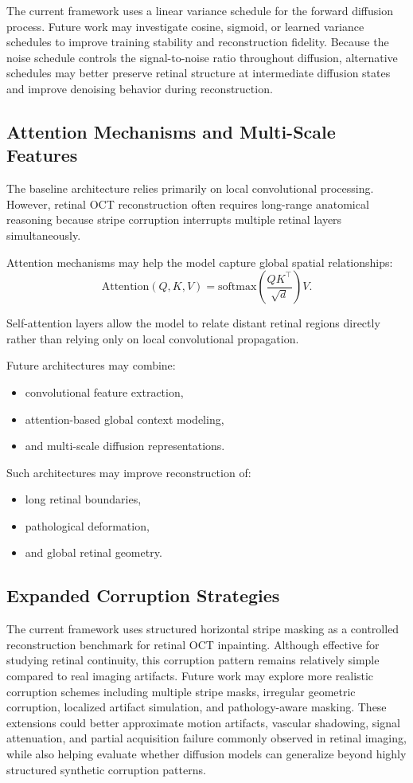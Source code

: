 \documentclass[12pt,oneside]{article}
\begin{document}
The current framework uses a linear variance schedule for the forward diffusion process. Future work may investigate cosine, sigmoid, or learned variance schedules to improve training stability and reconstruction fidelity. Because the noise schedule controls the signal-to-noise ratio throughout diffusion, alternative schedules may better preserve retinal structure at intermediate diffusion states and improve denoising behavior during reconstruction.
\subsection{Attention Mechanisms and Multi-Scale Features}

The baseline architecture relies primarily on local convolutional processing. However, retinal OCT reconstruction often requires long-range anatomical reasoning because stripe corruption interrupts multiple retinal layers simultaneously.

Attention mechanisms may help the model capture global spatial relationships:
\[
\mathrm{Attention}(Q,K,V)
=
\mathrm{softmax}
\left(
\frac{QK^\top}{\sqrt{d}}
\right)V.
\]

Self-attention layers allow the model to relate distant retinal regions directly rather than relying only on local convolutional propagation.

Future architectures may combine:
\begin{itemize}
    \item convolutional feature extraction,
    \item attention-based global context modeling,
    \item and multi-scale diffusion representations.
\end{itemize}

Such architectures may improve reconstruction of:
\begin{itemize}
    \item long retinal boundaries,
    \item pathological deformation,
    \item and global retinal geometry.
\end{itemize}

\subsection{Expanded Corruption Strategies}

The current framework uses structured horizontal stripe masking as a controlled reconstruction benchmark for retinal OCT inpainting. Although effective for studying retinal continuity, this corruption pattern remains relatively simple compared to real imaging artifacts. Future work may explore more realistic corruption schemes including multiple stripe masks, irregular geometric corruption, localized artifact simulation, and pathology-aware masking. These extensions could better approximate motion artifacts, vascular shadowing, signal attenuation, and partial acquisition failure commonly observed in retinal imaging, while also helping evaluate whether diffusion models can generalize beyond highly structured synthetic corruption patterns.
\end{document}
